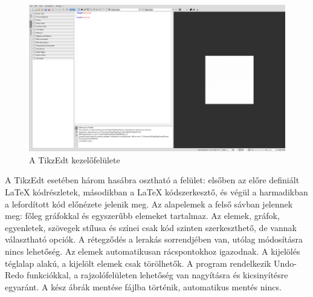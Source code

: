 \begin{figure}[!h]
	\includegraphics[width=\textwidth]{images/tikzedt.png}
	\caption{A TikzEdt kezelőfelülete \cite{tikzedt}}
\label{fig:tikzedt}
\end{figure}
A TikzEdt esetében három hasábra osztható a felület: elsőben az előre definiált LaTeX kódrészletek, másodikban a LaTeX kódszerkesztő, és végül a harmadikban a lefordított kód előnézete jelenik meg. Az alapelemek a felső sávban jelennek meg: főleg gráfokkal és egyszerűbb elemeket tartalmaz. Az elemek, gráfok, egyenletek, szövegek stílusa és színei csak kód szinten szerkeszthető, de vannak választható opciók. A rétegződés a lerakás sorrendjében van, utólag módosításra nincs lehetőség. Az elemek automatikusan rácspontokhoz igazodnak. A kijelölés téglalap alakú, a kijelölt elemek csak törölhetők.  A program rendelkezik Undo-Redo funkciókkal, a rajzolófelületen lehetőség van nagyításra és kicsinyítésre egyaránt. A kész ábrák mentése fájlba történik, automatikus mentés nincs.


